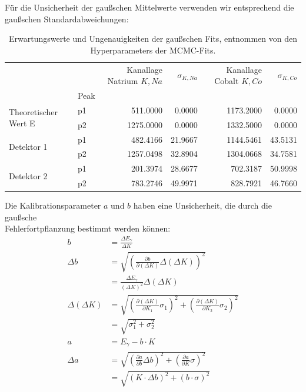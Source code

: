 \documentclass[%
aps,
onecolumn,
11pt,
tightenlines,
nofootinbib,
superscriptaddress,
floatfix,
prd,
]{revtex4-2}
\begin{document}
Für die Unsicherheit der gaußschen Mittelwerte verwenden wir entsprechend die gaußschen Standardabweichungen:
\begin{table}[H]
    \centering
    \begin{tabular}{llr|r|r|r}
	\toprule
	 &  & Kanallage Natrium $K,Na$ & $\sigma_{K,Na}$ & Kanallage Cobalt $K,Co$ & $\sigma_{K,Co}$ \\
	 & Peak &  &  &  &  \\
	\midrule
	\multirow[t]{2}{*}{Theoretischer Wert E} & p1 & 511.0000 & 0.0000 & 1173.2000 & 0.0000 \\
	 & p2 & 1275.0000 & 0.0000 & 1332.5000 & 0.0000 \\
	\cline{1-6}
	\multirow[t]{2}{*}{Detektor 1} & p1 & 482.4166 & 21.9667 & 1144.5461 & 43.5131 \\
	 & p2 & 1257.0498 & 32.8904 & 1304.0668 & 34.7581 \\
	\cline{1-6}
	\multirow[t]{2}{*}{Detektor 2} & p1 & 201.3974 & 28.6677 & 702.3187 & 50.9998 \\
	 & p2 & 783.2746 & 49.9971 & 828.7921 & 46.7660 \\
	\cline{1-6}
	\bottomrule
	\end{tabular}
	\caption{Erwartungswerte und Ungenauigkeiten der gaußschen Fits, entnommen von den Hyperparameters der MCMC-Fits.}
	\label{tab:mcmcerror}
\end{table}
\newpage
Die Kalibrationsparameter $a$ und $b$ haben eine Unsicherheit, die durch die gaußsche \\
Fehlerfortpflanzung bestimmt werden können: 
\begin{align}
    b                &= \frac{\Delta E_\gamma}{\Delta K} \\
    \Delta b         &=  \sqrt{ \left ( \frac{\partial b}{\partial (\Delta K)}\Delta(\Delta K) \right )^2 } \\
                     &= \frac{\Delta E_{\gamma}}{(\Delta K)^2}\Delta (\Delta K) \\
    \Delta(\Delta K) &= \sqrt{ \left( \frac{\partial(\Delta K)}{\partial K_1} \sigma_1 \right)^2 + 
        \left( \frac{\partial(\Delta K)}{\partial K_2} \sigma_2 \right)^2} \\
                     &= \sqrt{\sigma_1^2 + \sigma_2^2}\\
    a                &= E_{\gamma} - b \cdot K \\
    \Delta a         &= \sqrt{ \left( \frac{\partial a}{\partial b} \Delta b \right)^2 + 
        \left( \frac{\partial a}{\partial K} \sigma \right)^2  } \\
                     &= \sqrt{ \left( K \cdot \Delta b \right)^2 + \left( b \cdot \sigma \right)^2 }
\end{align}
\end{document}
